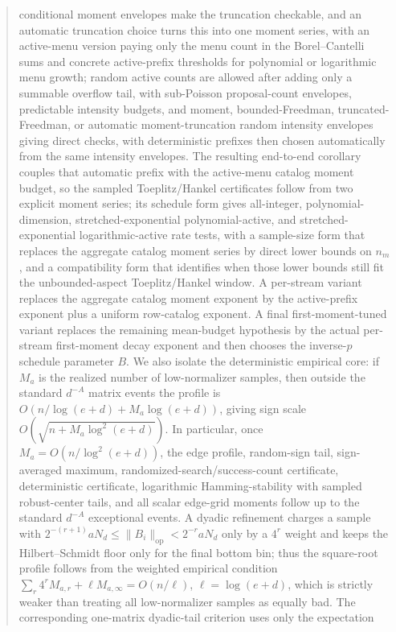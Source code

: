 \documentclass[11pt]{amsart}
\numberwithin{equation}{section}
\theoremstyle{definition}
\theoremstyle{remark}
\newcommand{\op}{\mathrm{op}}
\begin{document}
\begin{abstract}
conditional moment envelopes make the truncation checkable, and an automatic
truncation choice turns this into one moment series, with an active-menu
version paying only the menu count in the Borel--Cantelli sums and concrete
active-prefix thresholds for polynomial or logarithmic menu growth; random
active counts are allowed after adding only a summable overflow tail, with
sub-Poisson proposal-count envelopes, predictable intensity budgets, and
moment, bounded-Freedman, truncated-Freedman, or automatic moment-truncation
random intensity envelopes giving direct checks, with deterministic prefixes
then chosen automatically from the same intensity envelopes.
The resulting end-to-end corollary couples that automatic prefix with the
active-menu catalog moment budget, so the sampled Toeplitz/Hankel certificates
follow from two explicit moment series; its schedule form gives all-integer,
polynomial-dimension, stretched-exponential polynomial-active, and
stretched-exponential logarithmic-active rate tests, with a sample-size form
that replaces the aggregate catalog moment series by direct lower bounds on
\(n_m\), and a compatibility form that identifies when those lower bounds still
fit the unbounded-aspect Toeplitz/Hankel window.  A per-stream variant replaces
the aggregate catalog moment exponent by the active-prefix exponent plus a
uniform row-catalog exponent.  A final first-moment-tuned variant replaces the
remaining mean-budget hypothesis by the actual per-stream first-moment decay
exponent and then chooses the inverse-\(p\) schedule parameter \(B\).
We also isolate the deterministic empirical
core: if \(M_a\) is the realized number of low-normalizer samples, then outside
the standard \(d^{-A}\) matrix events the profile is
\(O(n/\log(e+d)+M_a\log(e+d))\), giving sign scale
\(O(\sqrt{n+M_a\log^2(e+d)})\).  In particular, once
\(M_a=O(n/\log^2(e+d))\), the edge profile, random-sign tail, sign-averaged
maximum, randomized-search/success-count certificate, deterministic certificate, logarithmic
Hamming-stability with sampled robust-center tails, and all scalar edge-grid moments follow up to the standard \(d^{-A}\) exceptional
events.  A dyadic refinement charges a sample with
\(2^{-(r+1)}aN_d\le\|B_i\|_{\op}<2^{-r}aN_d\) only by a \(4^r\) weight and
keeps the Hilbert--Schmidt floor only for the final bottom bin; thus the
square-root profile follows from the weighted empirical condition
\(\sum_r4^rM_{a,r}+\ell M_{a,\infty}=O(n/\ell)\), \(\ell=\log(e+d)\), which is
strictly weaker than treating all low-normalizer samples as equally bad.  The
corresponding one-matrix dyadic-tail criterion uses only the expectation

\end{abstract}
\end{document}

